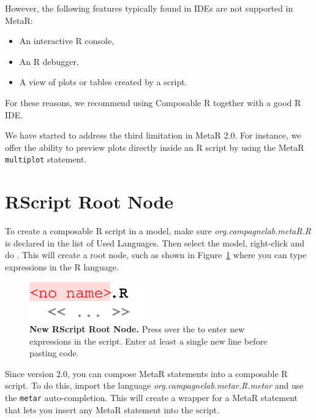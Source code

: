 \noindent{}However, the following features typically found in IDEs are not supported in MetaR:

\begin{itemize}
  \item An interactive R console,
  \item An R debugger,
  \item A view of plots or tables created by a script. 
\end{itemize}

For these reasons, we recommend using Composable R together with a good R IDE.

\begin{remark}
We have started to address the third limitation in MetaR 2.0. For instance, we offer the ability to preview plots directly inside an R script by using the MetaR \texttt{multiplot} statement. 
\end{remark}

\section{RScript Root Node}
To create a composable R script in a model, make sure \textit{org.campagnelab.metaR.R} is declared in the list of Used Languages. Then select the model, right-click and do . This will create a root node, such as shown in Figure~\ref{fig:NewRScriptRootNode} where you can type expressions in the R language. 

\begin{figure}[tbhp]
  \centering
  \includegraphics[width=\figWidthTiny]{figures/NewRScriptRootNode.pdf}
\caption[New RScript Root Node]{\textbf{New RScript Root Node.} Press \keys{\return} over the \mpsplaceholder{} to enter new expressions in the script. Enter at least a single new line before pasting code.}
\label{fig:NewRScriptRootNode}
\end{figure}

\begin{remark}
Since version 2.0, you can compose MetaR statements into a composable R script. To do this, import the language \textit{org.campagnelab.metar.R.metar} and use the \texttt{metar} auto-completion. This will create a wrapper for a MetaR statement that lets you insert any MetaR statement into the script. 
\end{remark}

